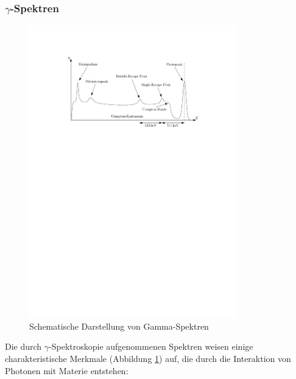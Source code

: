 \documentclass[11pt, a4paper]{article}
\numberwithin{equation}{section}
\begin{document}
\subsubsection{$\gamma$-Spektren}
\label{sec:gamma_spektren}
\begin{figure}[ht]
	\centering
	\includegraphics[width=0.8\textwidth]{./figures/spektrum.pdf}
	\caption{Schematische Darstellung von Gamma-Spektren}
	\label{fig:schema_spektrum}
\end{figure}
\noindent Die durch $\gamma$-Spektroskopie aufgenommenen Spektren weisen einige charakteristische Merkmale (Abbildung \ref{fig:schema_spektrum}) auf, die durch die Interaktion von Photonen mit Materie entstehen:
\end{document}
